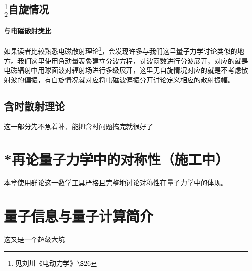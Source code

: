 \documentclass[a4paper,zihao=-4,linespread=1]{ctexrep}
\begin{document}
	\section{$\frac{1}{2}$自旋情况}
	\subsubsection{与电磁散射类比}
	如果读者比较熟悉电磁散射理论\footnote{见刘川《电动力学》$\S26$}，会发现许多与我们这里量子力学讨论类似的地方。我们这里使用角动量表象建立分波方程，对波函数进行分波展开，对应的就是电磁辐射中用球面波对辐射场进行多级展开，这里无自旋情况对应的就是不考虑散射波的偏振，有自旋情况就对应将电磁波偏振分开讨论定义相应的散射振幅。
	\section{含时散射理论}
	这一部分先不急着补，能把含时问题搞完就很好了
	
	
	\chapter{*再论量子力学中的对称性（施工中）}
	本章使用群论这一数学工具严格且完整地讨论对称性在量子力学中的体现。
	
	\chapter{量子信息与量子计算简介}
	这又是一个超级大坑
	
	
     
    
\end{document}
